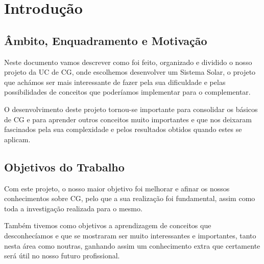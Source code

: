 \chapter{Introdução}
\label{chap:intro}

\section{Âmbito, Enquadramento e Motivação}
\label{sec:amb} 


Neste documento vamos descrever como foi feito, organizado e dividido o nosso projeto da \ac{UC} de \ac{CG}, onde escolhemos desenvolver um Sistema Solar, o projeto que achámos ser mais interessante de fazer pela sua dificuldade e pelas possibilidades de conceitos que poderíamos implementar para o complementar.

\noindent
O desenvolvimento deste projeto tornou-se importante para consolidar os básicos de \ac{CG} e para aprender outros conceitos muito importantes e que nos deixaram fascinados pela sua complexidade e pelos resultados obtidos quando estes se aplicam. 

\section{Objetivos do Trabalho}
\label{sec:obj}

Com este projeto, o nosso maior objetivo foi melhorar e afinar
os nossos conhecimentos sobre \ac{CG}, pelo que a sua realização foi fundamental, assim como toda a investigação realizada para o mesmo.

\noindent
Também tivemos como objetivos a aprendizagem de conceitos que desconhecíamos e que se mostraram ser muito interessantes e importantes, tanto nesta área como noutras, ganhando assim um conhecimento extra que certamente será útil no nosso futuro profissional.

